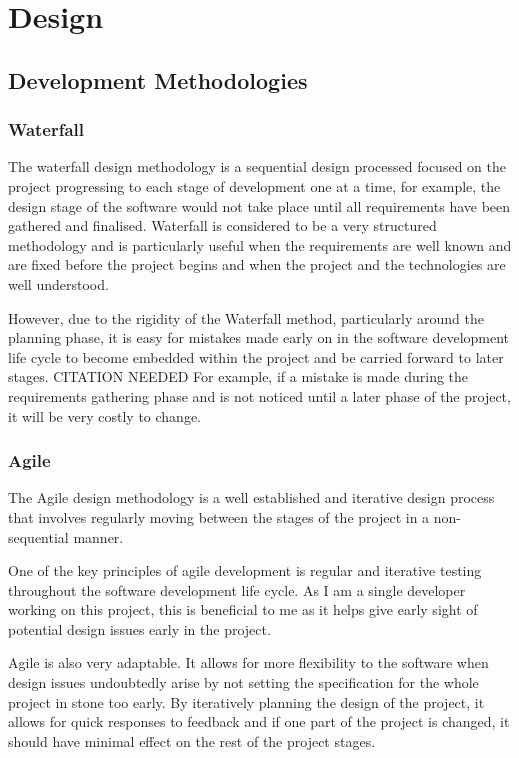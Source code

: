 

\chapter{Design}

\section{Development Methodologies}

\subsection{Waterfall}
The waterfall design methodology is a sequential design processed focused on the project progressing to each stage of development one at a time, for example, the design stage of the software would not take place until all requirements have been gathered and finalised.
Waterfall is considered to be a very structured methodology and is particularly useful when the requirements are well known and are fixed before the project begins and when the project and the technologies are well understood.

However, due to the rigidity of the Waterfall method, particularly around the planning phase, it is easy for mistakes made early on in the software development life cycle to become embedded within the project and be carried forward to later stages. CITATION NEEDED
For example, if a mistake is made during the requirements gathering phase and is not noticed until a later phase of the project, it will be very costly to change.

\subsection{Agile}
The Agile design methodology is a well established and iterative design process that involves regularly moving between the stages of the project in a non-sequential manner. 

One of the key principles of agile development is regular and iterative testing throughout the software development life cycle.
As I am a single developer working on this project, this is beneficial to me as it helps give early sight of potential design issues early in the project.

Agile is also very adaptable.
It allows for more flexibility to the software when design issues undoubtedly arise by not setting the specification for the whole project in stone too early.
By iteratively planning the design of the project, it allows for quick responses to feedback and if one part of the project is changed, it should have minimal effect on the rest of the project stages. 

